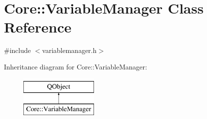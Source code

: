 \hypertarget{class_core_1_1_variable_manager}{\section{Core\-:\-:Variable\-Manager Class Reference}
\label{class_core_1_1_variable_manager}
}


{\ttfamily \#include $<$variablemanager.\-h$>$}

Inheritance diagram for Core\-:\-:Variable\-Manager\-:\begin{figure}[H]
\begin{center}
\leavevmode
\includegraphics[height=2.000000cm]{class_core_1_1_variable_manager}
\end{center}
\end{figure}
